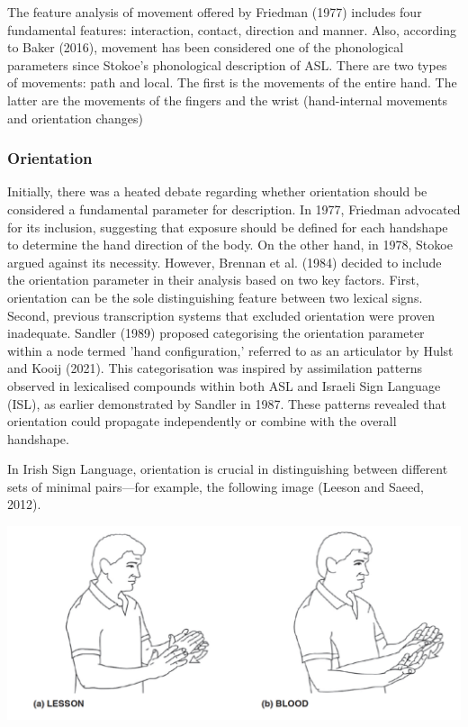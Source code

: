 The feature analysis of movement offered by Friedman (1977) includes four fundamental features: interaction, contact, direction and manner. Also, according to Baker (2016), movement has been considered one of the phonological parameters since Stokoe's phonological description of ASL. There are two types of movements: path and local. The first is the movements of the entire hand. The latter are the movements of the fingers and the wrist (hand-internal movements and orientation changes) 


\subsubsection{Orientation}

Initially, there was a heated debate regarding whether orientation should be considered a fundamental parameter for description. In 1977, Friedman advocated for its inclusion, suggesting that exposure should be defined for each handshape to determine the hand direction of the body. On the other hand, in 1978, Stokoe argued against its necessity. However, Brennan et al. (1984) decided to include the orientation parameter in their analysis based on two key factors. First, orientation can be the sole distinguishing feature between two lexical signs. Second, previous transcription systems that excluded orientation were proven inadequate.
Sandler (1989) proposed categorising the orientation parameter within a node termed 'hand configuration,' referred to as an articulator by Hulst and Kooij (2021). This categorisation was inspired by assimilation patterns observed in lexicalised compounds within both ASL and Israeli Sign Language (ISL), as earlier demonstrated by Sandler in 1987. These patterns revealed that orientation could propagate independently or combine with the overall handshape.

In Irish Sign Language, orientation is crucial in distinguishing between different sets of minimal pairs—for example, the following image (Leeson and Saeed, 2012).

\includegraphics[width=\textwidth]{figures/orientation.png}


